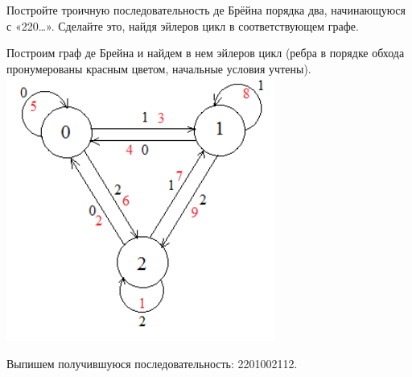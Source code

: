 \begin{task}{84}Постройте троичную последовательность де Брёйна порядка два, начинающуюся с «220…». Сделайте это, найдя эйлеров цикл в соответствующем графе.
\end{task}
\begin{solution}
Построим граф де Брейна и найдем в нем эйлеров цикл (ребра в порядке обхода пронумерованы красным цветом, начальные условия учтены).
\includegraphics[width = 250pt]{img/id84.png}

Выпишем получившуюся последовательность: 2201002112.
\end{solution}